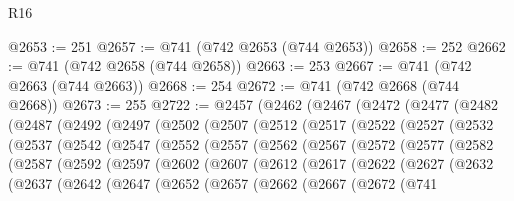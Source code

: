 \begin{lexlean}{R16}
\begin{coremodule}
@2653 := 251
@2657 := @741 (@742 @2653 (@744 @2653))
@2658 := 252
@2662 := @741 (@742 @2658 (@744 @2658))
@2663 := 253
@2667 := @741 (@742 @2663 (@744 @2663))
@2668 := 254
@2672 := @741 (@742 @2668 (@744 @2668))
@2673 := 255
@2722 := @2457
    (@2462
      (@2467
        (@2472
          (@2477
            (@2482
              (@2487
                (@2492
                  (@2497
                    (@2502
                      (@2507
                        (@2512
                          (@2517
                            (@2522
                              (@2527
                                (@2532
                                  (@2537
                                    (@2542
                                      (@2547
                                        (@2552
                                          (@2557
                                            (@2562
                                              (@2567
                                                (@2572
                                                  (@2577
                                                    (@2582
                                                      (@2587
                                                        (@2592
                                                          (@2597
                                                            (@2602
                                                              (@2607
                                                                (@2612
                                                                  (@2617
                                                                    (@2622
                                                                      (@2627
                                                                        (@2632
                                                                          (@2637
                                                                            (@2642
                                                                              (@2647
                                                                                (@2652
                                                                                  (@2657
                                                                                    (@2662
                                                                                      (@2667
                                                                                        (@2672
                                                                                          (@741

\end{coremodule}
\end{lexlean}
